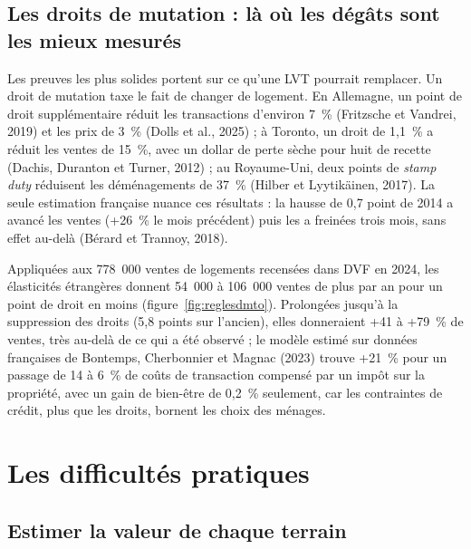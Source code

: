 \documentclass[11pt,a4paper]{article}
\begin{document}

\subsection{Les droits de mutation : là où les dégâts sont les mieux mesurés}

Les preuves les plus solides portent sur ce qu'une LVT pourrait remplacer. Un droit de mutation
taxe le fait de changer de logement. En Allemagne, un point de droit supplémentaire réduit les
transactions d'environ 7~\% (Fritzsche et Vandrei, 2019) et les prix de 3~\% (Dolls et al., 2025) ;
à Toronto, un droit de 1,1~\% a réduit les ventes de 15~\%, avec un dollar de perte sèche pour huit
de recette (Dachis, Duranton et Turner, 2012) ; au Royaume-Uni, deux points de \emph{stamp duty}
réduisent les déménagements de 37~\% (Hilber et Lyytikäinen, 2017). La seule estimation française
nuance ces résultats : la hausse de 0,7 point de 2014 a avancé les ventes (+26~\% le mois précédent)
puis les a freinées trois mois, sans effet au-delà (Bérard et Trannoy, 2018).

Appliquées aux 778~000 ventes de logements recensées dans DVF en 2024, les élasticités étrangères
donnent 54~000 à 106~000 ventes de plus par an pour un point de droit en moins
(figure~\ref{fig:reglesdmto}). Prolongées jusqu'à la suppression des droits (5,8 points sur
l'ancien), elles donneraient +41 à +79~\% de ventes, très au-delà de ce qui a été observé ; le
modèle estimé sur données françaises de Bontemps, Cherbonnier et Magnac (2023) trouve +21~\% pour
un passage de 14 à 6~\% de coûts de transaction compensé par un impôt sur la propriété, avec un
gain de bien-être de 0,2~\% seulement, car les contraintes de crédit, plus que les droits, bornent
les choix des ménages.


\section{Les difficultés pratiques}\label{sec:difficultes}

\subsection{Estimer la valeur de chaque terrain}
\end{document}
